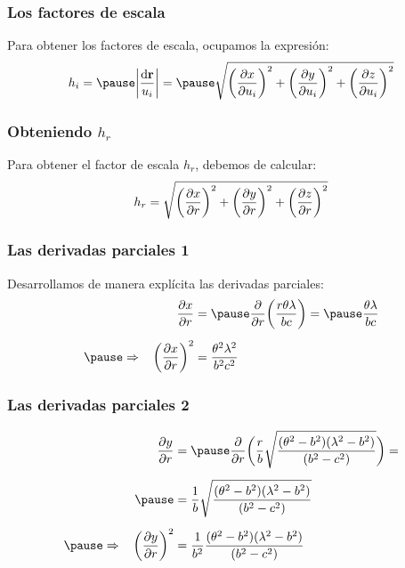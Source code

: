 \documentclass[12pt]{beamer}
\begin{document}
\begin{frame}
\frametitle{Los factores de escala}
Para obtener los factores de escala, ocupamos la expresión:
\pause
\begin{eqnarray*}
h_{i} = \pause \abs{\dfrac{\dd{\vb{r}}}{u_{i}}} = \pause \sqrt{\bigg( \pdv{x}{u_{i}} \bigg)^{2} + \bigg( \pdv{y}{u_{i}} \bigg)^{2} + \bigg( \pdv{z}{u_{i}} \bigg)^{2}}
\end{eqnarray*}
\end{frame}
\begin{frame}
\frametitle{Obteniendo $h_{r}$}
Para obtener el factor de escala $h_{r}$, debemos de calcular:
\pause
\begin{align*}
h_{r} = \sqrt{\bigg( \pdv{x}{r} \bigg)^{2} + \bigg( \pdv{y}{r} \bigg)^{2} + \bigg( \pdv{z}{r} \bigg)^{2}}
\end{align*}
\end{frame}
\begin{frame}
\frametitle{Las derivadas parciales 1}
Desarrollamos de manera explícita las derivadas parciales:
\pause
\begin{eqnarray*}
\begin{aligned}
\pdv{x}{r} &= \pause \displaystyle \pdv{r} \bigg( \dfrac{r \theta \lambda}{b c} \bigg) = \pause \dfrac{\theta \lambda}{b c} \\[0.5em] \pause
\Rightarrow \hspace{0.3cm} \bigg( \pdv{x}{r} \bigg)^{2} &= \dfrac{\theta^{2} \lambda^{2}}{b^{2} c^{2}}
\end{aligned}
\end{eqnarray*}
\end{frame}
\begin{frame}
\frametitle{Las derivadas parciales 2}
\begin{eqnarray*}
\begin{aligned}
\pdv{y}{r} &= \pause \pdv{r} \bigg( \dfrac{r}{b} \sqrt{\dfrac{ (\theta^{2} - b^{2}) (\lambda^{2} - b^{2}) }{(b^{2} - c^{2})}} \bigg) = \\[0.5em] \pause
&= \dfrac{1}{b} \sqrt{\dfrac{ (\theta^{2} - b^{2}) (\lambda^{2} - b^{2}) }{(b^{2} - c^{2})}} \\[0.5em] \pause
\Rightarrow \hspace{0.3cm} \bigg( \pdv{y}{r} \bigg)^{2} &= \dfrac{1}{b^{2}} \dfrac{ (\theta^{2} - b^{2}) (\lambda^{2} - b^{2})}{(b^{2} - c^{2})}
\end{aligned}
\end{eqnarray*}
\end{frame}
\end{document}
